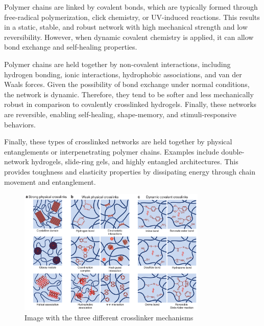 Polymer chains are linked by covalent bonds, which are typically formed through free-radical polymerization, click chemistry, or UV-induced reactions.
This results in a static, stable, and robust network with high mechanical strength and low reversibility.
However, when dynamic covalent chemistry is applied, it can allow bond exchange and self-healing properties.

Polymer chains are held together by non-covalent interactions, including hydrogen bonding, ionic interactions, hydrophobic associations, and van der Waals forces.
Given the possibility of bond exchange under normal conditions, the network is dynamic.
Therefore, they tend to be softer and less mechanically robust in comparison to covalently crosslinked hydrogels.
Finally, these networks are reversible, enabling self-healing, shape-memory, and stimuli-responsive behaviors.

Finally, these types of crosslinked networks are held together by physical entanglements or interpenetrating polymer chains.
Examples include double-network hydrogels, slide-ring gels, and highly entangled architectures.
This provides toughness and elasticity properties by dissipating energy through chain movement and entanglement.

\begin{figure}[!ht]
    \centering
    \includegraphics[width=0.8\textwidth]{figs/crosslinker_mechanisms.png}
    \caption{Image with the three different crosslinker mechanisms}
\end{figure}

